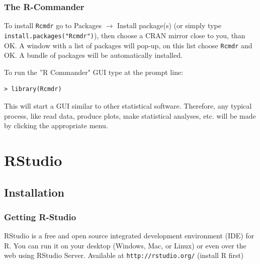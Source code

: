 \documentclass[xcolor={table},c]{beamer}
\begin{document}
\begin{frame}[fragile]\frametitle{The R-Commander}
To install \texttt{Rcmdr}  go to Packages $\rightarrow$ Install package(s) (or simply type \verb|install.packages("Rcmdr")|), then choose a CRAN mirror close to you, than OK. A window with a list of packages will pop-up, on this list choose \texttt{Rcmdr} and OK. A bundle of packages will be automatically installed.

To run the ''R Commander" GUI type at the prompt line:
\begin{verbatim}
> library(Rcmdr)
\end{verbatim}
This will start a GUI similar to other statistical software. Therefore, any typical process, like read data, produce plots, make statistical analyses, etc. will be made by clicking the appropriate menu.
\end{frame}

\section{RStudio}
\subsection{Installation}
\begin{frame}\frametitle{Getting R-Studio}
  RStudio is a free and open source integrated development environment (IDE) for R. You can run it on your desktop (Windows, Mac, or Linux) or even over the web using RStudio Server. Available at \texttt{http://rstudio.org/} (install R first)
\begin{center}
\end{center}
\end{frame}
\end{document}
